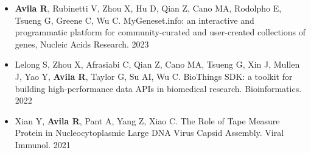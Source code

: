 %
%


\vspace{0.2cm}
\begin{itemize}
    \item \textbf{Avila R}, Rubinetti V, Zhou X, Hu D, Qian Z, Cano MA, Rodolpho E, Tsueng G, Greene C, Wu C. MyGeneset.info: an interactive and programmatic platform for community-curated and user-created collections of genes, Nucleic Acids Research. 2023
    \item Lelong S, Zhou X, Afrasiabi C, Qian Z, Cano MA, Tsueng G, Xin J, Mullen J, Yao Y, \textbf{Avila R}, Taylor G, Su AI, Wu C. BioThings SDK: a toolkit for building high-performance data APIs in biomedical research. Bioinformatics. 2022
    \item Xian Y, \textbf{Avila R}, Pant A, Yang Z, Xiao C. The Role of Tape Measure Protein in Nucleocytoplasmic Large DNA Virus Capsid Assembly. Viral Immunol. 2021\\
\end{itemize}